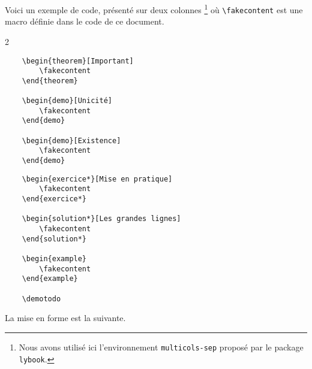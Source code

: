 Voici un exemple de code, présenté sur deux colonnes
\footnote{
	Nous avons utilisé ici l'environnement \texttt{multicols-sep} proposé par le package \texttt{lybook}.
}
où \verb+\fakecontent+ est une macro définie dans le code de ce document.

\begin{frame-gene}
	\small
	\begin{multicols-sep}{2}
		\begin{verbatim}
	\begin{theorem}[Important]
    	\fakecontent
	\end{theorem}

	\begin{demo}[Unicité]
    	\fakecontent
	\end{demo}

	\begin{demo}[Existence]
    	\fakecontent
	\end{demo}
		\end{verbatim}


		\columnbreak


		\begin{verbatim}
	\begin{exercice*}[Mise en pratique]
    	\fakecontent
	\end{exercice*}

	\begin{solution*}[Les grandes lignes]
    	\fakecontent
	\end{solution*}

	\begin{example}
	    \fakecontent
	\end{example}

	\demotodo
		\end{verbatim}
	\end{multicols-sep}
\end{frame-gene}




La mise en forme est la suivante.

